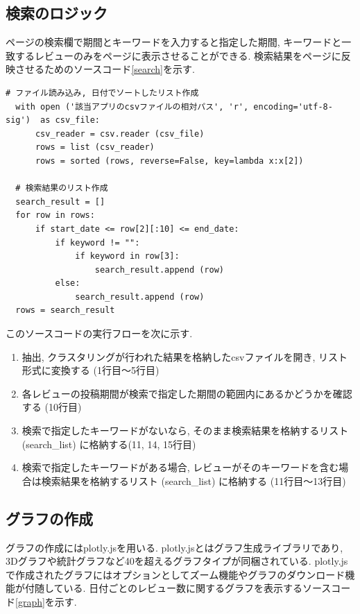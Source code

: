 \subsection{検索のロジック}
ページの検索欄で期間とキーワードを入力すると指定した期間, キーワードと一致するレビューのみをページに表示させることができる. 
検索結果をページに反映させるためのソースコード\ref{search}を示す. 

\begin{lstlisting}[caption=view.py, label=search]
  # ファイル読み込み, 日付でソートしたリスト作成
  with open ('該当アプリのcsvファイルの相対パス', 'r', encoding='utf-8-sig')  as csv_file:
      csv_reader = csv.reader (csv_file) 
      rows = list (csv_reader) 
      rows = sorted (rows, reverse=False, key=lambda x:x[2]) 

  # 検索結果のリスト作成
  search_result = []
  for row in rows:
      if start_date <= row[2][:10] <= end_date:
          if keyword != "":
              if keyword in row[3]:
                  search_result.append (row) 
          else:
              search_result.append (row) 
  rows = search_result
\end{lstlisting}

このソースコードの実行フローを次に示す. 

\begin{enumerate}
  \item 抽出, クラスタリングが行われた結果を格納したcsvファイルを開き, リスト形式に変換する (1行目〜5行目)
  \item 各レビューの投稿期間が検索で指定した期間の範囲内にあるかどうかを確認する (10行目)
  \item 検索で指定したキーワードがないなら, そのまま検索結果を格納するリスト (search\_list) に格納する(11, 14, 15行目)
  \item 検索で指定したキーワードがある場合, レビューがそのキーワードを含む場合は検索結果を格納するリスト (search\_list) に格納する (11行目〜13行目)
\end{enumerate}

\subsection{グラフの作成}
グラフの作成にはplotly.jsを用いる. plotly.jsとはグラフ生成ライブラリであり, 3Dグラフや統計グラフなど40を超えるグラフタイプが同梱されている\cite{plotly}.
plotly.jsで作成されたグラフにはオプションとしてズーム機能やグラフのダウンロード機能が付随している. 
日付ごとのレビュー数に関するグラフを表示するソースコード\ref{graph}を示す. 

